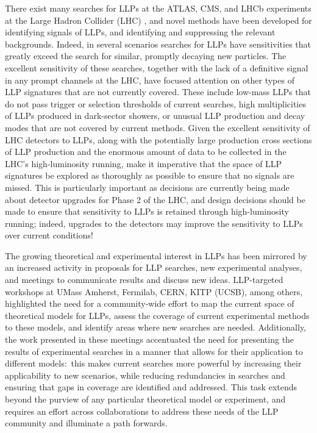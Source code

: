 There exist many searches for LLPs at the ATLAS, CMS, and LHCb experiments at the Large Hadron Collider (LHC) \cite{another-massive-cite-dump}, and novel methods have been developed for identifying signals of LLPs, and identifying and suppressing the relevant backgrounds. Indeed, in several scenarios searches for LLPs have sensitivities that greatly exceed the search for similar, promptly decaying new particles. The excellent sensitivity of these searches, together with the lack of a definitive signal in any prompt channels at the LHC, have focused attention on other types of LLP signatures that are not currently covered. These include low-mass LLPs that do not pass trigger or selection thresholds of current searches, high multiplicities of LLPs produced in dark-sector showers, or unusual LLP production and decay modes that are not covered by current methods. Given the excellent  sensitivity of LHC detectors to LLPs, along with the potentially large production cross sections of LLP production and the enormous amount of data to be collected in the LHC's high-luminosity running, make it imperative that the space of LLP signatures be explored as thoroughly as possible to ensure that no signals are missed. This is particularly important as decisions are currently being made about detector upgrades for Phase 2 of the LHC, and design decisions should be made to ensure that sensitivity to LLPs is retained through high-luminosity running; indeed, upgrades to the detectors may improve the sensitivity to LLPs over current conditions!

The growing theoretical and experimental interest in LLPs has been mirrored by an increased activity in proposals for LLP searches, new experimental analyses, and meetings to communicate results and discuss new ideas. LLP-targeted workshops at UMass Amherst, Fermilab, CERN, KITP (UCSB), among others, highlighted the need for a community-wide effort to map the current space of theoretical models for LLPs, assess the coverage of current experimental methods to these models, and identify areas where new searches are needed. Additionally, the work presented in these meetings accentuated the need for presenting the results of experimental searches in a manner that allows for their application to different models:~this makes current searches more powerful by increasing their applicability to new scenarios, while reducing redundancies in searches and ensuring that gaps in coverage are identified and addressed. This task extends beyond the purview of any particular theoretical model or experiment, and requires an effort across collaborations to address these needs of the LLP community and illuminate a path forwards. 

